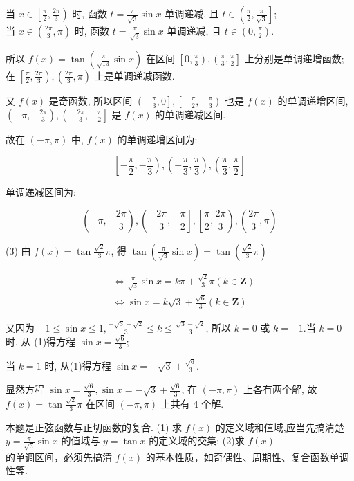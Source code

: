 \begin{solution}
			当 $x \in\left[\frac{\pi}{2}, \frac{2 \pi}{3}\right)$ 时, 函数 $t=\frac{\pi}{\sqrt{3}} \sin x$ 单调递减, 且 $t \in\left(\frac{\pi}{2}, \frac{\pi}{\sqrt{3}}\right]$;\\
	当 $x \in\left(\frac{2 \pi}{3}, \pi\right)$ 时, 函数 $t=\frac{\pi}{\sqrt{3}} \sin x$ 单调递减, 且 $t \in\left(0, \frac{\pi}{2}\right)$.

	所以 $f(x)=\tan \left(\frac{\pi}{\sqrt{13}} \sin x\right)$ 在区间 $\left[0, \frac{\pi}{3}\right),\left(\frac{\pi}{3}, \frac{\pi}{2}\right]$ 上分别是单调递增函数; 在 $\left[\frac{\pi}{2}, \frac{2 \pi}{3}\right),\left(\frac{2 \pi}{3}, \pi\right)$ 上是单调递减函数.

				又 $f(x)$ 是奇函数, 所以区间 $\left(-\frac{\pi}{3}, 0\right],\left[-\frac{\pi}{2},-\frac{\pi}{3}\right)$ 也是 $f(x)$ 的单调递增区间, $\left(-\pi,-\frac{2 \pi}{3}\right),\left(-\frac{2 \pi}{3},-\frac{\pi}{2}\right]$ 是 $f(x)$ 的单调递减区间.

	故在 $(-\pi, \pi)$ 中, $f(x)$ 的单调递增区间为:

	$$
		\left[-\frac{\pi}{2},-\frac{\pi}{3}\right),\left(-\frac{\pi}{3}, \frac{\pi}{3}\right),\left(\frac{\pi}{3}, \frac{\pi}{2}\right]
	$$

	单调递减区间为:

	$$
		\left(-\pi,-\frac{2 \pi}{3}\right),\left(-\frac{2 \pi}{3},-\frac{\pi}{2}\right],\left[\frac{\pi}{2}, \frac{2 \pi}{3}\right),\left(\frac{2 \pi}{3}, \pi\right)
	$$

	(3) 由 $f(x)=\tan \frac{\sqrt{2}}{3} \pi$, 得 $\tan \left(\frac{\pi}{\sqrt{3}} \sin x\right)=\tan \left(\frac{\sqrt{2}}{3} \pi\right)$


	\begin{align*}
		 & \Leftrightarrow \frac{\pi}{\sqrt{3}} \sin x=k \pi+\frac{\sqrt{2}}{3} \pi(k \in \mathbf{Z}) \\
		 & \Leftrightarrow \sin x=k \sqrt{3}+\frac{\sqrt{6}}{3}(k \in \mathbf{Z}) \tag{1}
	\end{align*}


	又因为 $-1 \leqslant \sin x \leqslant 1, \frac{-\sqrt{3}-\sqrt{2}}{3} \leqslant k \leqslant \frac{\sqrt{3}-\sqrt{2}}{3}$, 所以 $k=0$ 或 $k=-1$.当 $k=0$ 时, 从 (1)得方程 $\sin x=\frac{\sqrt{6}}{3}$;

	当 $k=1$ 时, 从(1)得方程 $\sin x=-\sqrt{3}+\frac{\sqrt{6}}{3}$.

	显然方程 $\sin x=\frac{\sqrt{6}}{3}, \sin x=-\sqrt{3}+\frac{\sqrt{6}}{3}$, 在 $(-\pi, \pi)$ 上各有两个解, 故 $f(x)=\tan \frac{\sqrt{2}}{3} \pi$ 在区间 $(-\pi, \pi)$ 上共有 4 个解.
\end{solution}
\begin{note}
	本题是正弦函数与正切函数的复合. (1) 求 $f(x)$ 的定义域和值域,应当先搞清楚 $y=\frac{\pi}{\sqrt{3}} \sin x$ 的值域与 $y=\tan x$ 的定义域的交集; (2)求 $f(x)$\\
	的单调区间，必须先搞清 $f(x)$ 的基本性质，如奇偶性、周期性、复合函数单调性等.
\end{note}

